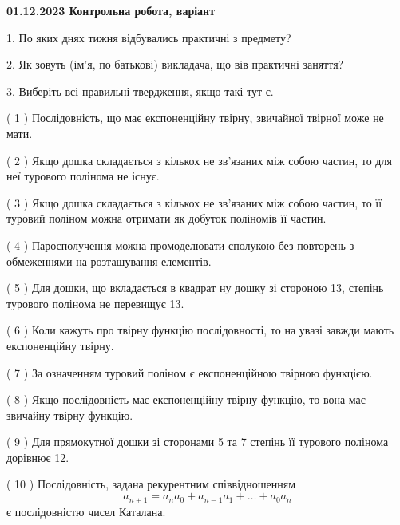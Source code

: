 \documentclass[12pt, ukrainian]{article}
\begin{document}
\vspace{4mm}
\newpage
\begin {large}

\textbf{01.12.2023 Контрольна робота, варіант  }\par


{
1. По яких днях тижня відбувались практичні з предмету?



\vspace{5mm}
2. Як зовуть (ім'я, по батькові) викладача, що вів практичні заняття?



\vspace{5mm}
3. Виберіть всі правильні твердження, якщо такі тут є.\par
\vspace{2mm}
( 1 ) Послідовність, що має експоненційну твірну, звичайної твірної може не мати.%

( 2 ) Якщо дошка складається з кількох не зв’язаних між собою частин, то для неї турового полінома не існує.%

( 3 ) Якщо дошка складається з кількох не зв’язаних між собою частин, то її туровий поліном можна отримати як добуток поліномів її частин.%

( 4 ) Паросполучення можна промоделювати сполукою без повторень з обмеженнями на розташування елементів.%

( 5 ) Для дошки, що вкладається в квадрат ну дошку зі стороною 13, степінь турового полінома не перевищує 13.%

( 6 ) Коли кажуть про твірну функцію послідовності, то на увазі завжди мають експоненційну твірну.%

( 7 ) За означенням туровий поліном є експоненційною твірною функцією.%

( 8 ) Якщо послідовність має експоненційну твірну функцію, то вона має звичайну твірну функцію.%

( 9 ) Для прямокутної дошки зі сторонами 5 та 7 степінь її турового полінома дорівнює 12.%

( 10 ) Послідовність, задана рекурентним співвідношенням $$a_{n+1}=a_{n}a_{0}+a_{n-1}a_{1}+\ldots+a_0a_{n}$$ є послідовністю чисел Каталана.%
}
\end {large}
\end{document}
